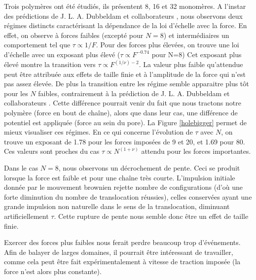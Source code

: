 \documentclass[a4paper,11pt]{article}
\begin{document}
Trois polymères ont été étudiés, ils présentent 8, 16 et 32 monomères. A l'instar des prédictions de J. L. A. Dubbeldam et collaborateurs \cite{traction}, nous observons deux régimes distincts caractérisant la dépendance de la loi d'échelle avec la force. En effet, on observe à forces faibles (excepté pour $N=8$) et intermédiaires un comportement tel que $\tau \propto 1/F$. Pour des forces plus élevées, on trouve une loi d'échelle avec un exposant plus élevé ($\tau \propto F^{-0.74}$ pour N=8) Cet exposant plus élevé montre la transition vers $\tau \propto F^{(1/\nu) -2}$. La valeur plus faible qu'attendue peut être attribuée aux effets de taille finie et à l'amplitude de la force qui n'est pas assez élevée. De plus la transition entre les régime semble apparaitre plus tôt pour les $N$ faibles, contrairement à la prédiction de J. L. A. Dubbeldam et collaborateurs \cite{traction}. Cette différence pourrait venir du fait que nous tractons notre polymère (force en bout de chaîne), alors que dans leur cas, une différence de potentiel est appliquée (force au sein du pore). La Figure \ref{holebigger} permet de mieux visualiser ces régimes. En ce qui concerne l'évolution de $\tau$ avec $N$, on trouve un exposant de 1.78 pour les forces imposées de 9 et 20, et 1.69 pour 80. Ces valeurs sont proches du cas $\tau \propto N^{(1+\nu)}$ attendu pour les forces importantes.

Dans le cas $N=8$, nous observons un décrochement de pente. Ceci se produit lorsque la force est faible et pour une chaîne très courte. L'impulsion initiale donnée par le mouvement brownien rejette nombre de configurations (d’où une forte diminution du nombre de translocation réussies), celles conservées ayant une grande impulsion non naturelle dans le sens de la translocation, diminuant artificiellement $\tau$. Cette rupture de pente nous semble donc être un effet de taille finie.

Exercer des forces plus faibles nous ferait perdre beaucoup trop d'événements. Afin de balayer de larges domaines, il pourrait être intéressant de travailler, comme cela peut être fait expérimentalement à vitesse de traction imposée (la force n'est alors plus constante).
\end{document}
